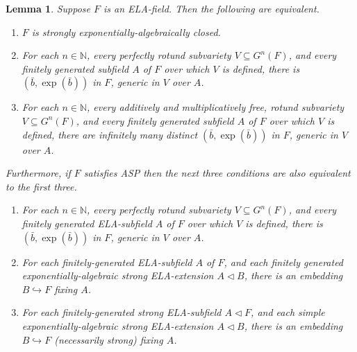 \documentclass[12pt]{amsart}
\newtheorem{lemma}[prop]{Lemma}
\theoremstyle{definition}
\begin{document}
\begin{lemma}\label{seac characterization}
 Suppose $F$ is an ELA-field. Then the following are equivalent.
 \begin{enumerate}
  \item[(1)] $F$ is strongly exponentially-algebraically closed.
  \item[(2)] For each $n \in {\ensuremath{\mathbb{N}}}$, every perfectly rotund subvariety $V {\subseteq} G^n(F)$, and every finitely generated subfield $A$ of $F$ over which $V$ is defined, there is $({{\ensuremath{\bar{b}}}},\exp({{\ensuremath{\bar{b}}}}))$ in $F$, generic in $V$ over $A$.
  \item[(3)] For each $n \in {\ensuremath{\mathbb{N}}}$, every additively and multiplicatively free, rotund subvariety $V {\subseteq} G^n(F)$, and every finitely generated subfield $A$ of $F$ over which $V$ is defined, there are infinitely many distinct $({{\ensuremath{\bar{b}}}},\exp({{\ensuremath{\bar{b}}}}))$ in $F$, generic in $V$ over $A$.
 \end{enumerate}
Furthermore, if $F$ satisfies ASP then the next three conditions are also equivalent to the first three.
\begin{enumerate}
 \item[(4)] For each $n \in {\ensuremath{\mathbb{N}}}$, every perfectly rotund subvariety $V {\subseteq} G^n(F)$, and every finitely generated ELA-subfield $A$ of $F$ over which $V$ is defined, there is $({{\ensuremath{\bar{b}}}},\exp({{\ensuremath{\bar{b}}}}))$ in $F$, generic in $V$ over $A$.
\item[(5)] For each finitely-generated ELA-subfield $A$ of $F$, and each finitely generated exponentially-algebraic strong ELA-extension $A {\ensuremath{\lhd}} B$, there is an embedding $B {\hookrightarrow} F$ fixing $A$.
\item[(6)] For each finitely-generated strong ELA-subfield $A {\ensuremath{\lhd}} F$, and each simple exponentially-algebraic strong ELA-extension $A {\ensuremath{\lhd}} B$, there is an embedding $B {\hookrightarrow} F$ (necessarily strong) fixing $A$.
\end{enumerate}
\end{lemma}
\end{document}
